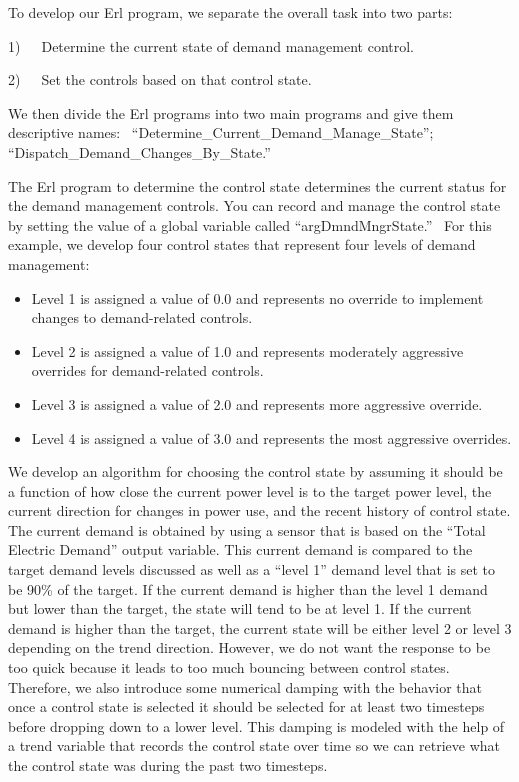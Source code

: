To develop our Erl program, we separate the overall task into two parts:

1)~~~Determine the current state of demand management control.

2)~~~Set the controls based on that control state.

We then divide the Erl programs into two main programs and give them descriptive names:~ ``Determine\_Current\_Demand\_Manage\_State'';~ ``Dispatch\_Demand\_Changes\_By\_State.''

The Erl program to determine the control state determines the current status for the demand management controls. You can record and manage the control state by setting the value of a global variable called ``argDmndMngrState.''~ For this example, we develop four control states that represent four levels of demand management:

\begin{itemize}
\item
  Level 1 is assigned a value of 0.0 and represents no override to implement changes to demand-related controls.
\item
  Level 2 is assigned a value of 1.0 and represents moderately aggressive overrides for demand-related controls.
\item
  Level 3 is assigned a value of 2.0 and represents more aggressive override.
\item
  Level 4 is assigned a value of 3.0 and represents the most aggressive overrides.
\end{itemize}

We develop an algorithm for choosing the control state by assuming it should be a function of how close the current power level is to the target power level, the current direction for changes in power use, and the recent history of control state. The current demand is obtained by using a sensor that is based on the ``Total Electric Demand'' output variable. This current demand is compared to the target demand levels discussed as well as a ``level 1'' demand level that is set to be 90\% of the target. If the current demand is higher than the level 1 demand but lower than the target, the state will tend to be at level 1. If the current demand is higher than the target, the current state will be either level 2 or level 3 depending on the trend direction. However, we do not want the response to be too quick because it leads to too much bouncing between control states. Therefore, we also introduce some numerical damping with the behavior that once a control state is selected it should be selected for at least two timesteps before dropping down to a lower level. This damping is modeled with the help of a trend variable that records the control state over time so we can retrieve what the control state was during the past two timesteps.

